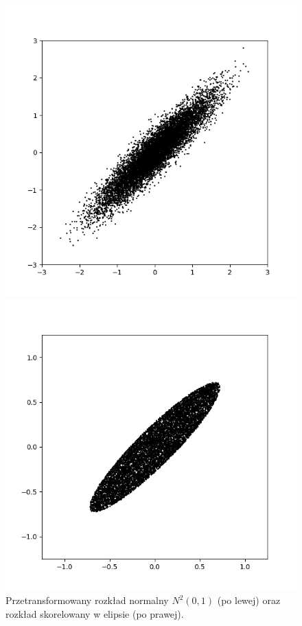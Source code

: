 \documentclass[a4paper,12pt,twoside]{article}
\begin{document}
 \begin{figure}[h!]
    \begin{minipage}{0.55\textwidth}
        \centering
        \includegraphics[scale = 0.5]{Carlo_5.png}
    \end{minipage}
    \begin{minipage}{0.55\textwidth}
        \includegraphics[scale = 0.5]{Carlo_4.png}
    \end{minipage}
    \caption{Przetransformowany rozkład normalny $N^2(0,1)$ (po lewej) oraz rozkład skorelowany w elipsie (po prawej).  }
\end{figure}
\end{document}
